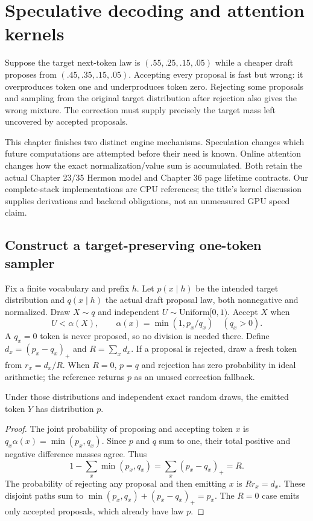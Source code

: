 \chapter{Speculative decoding and attention kernels}
\label{evod38:chapter}

Suppose the target next-token law is $(.55,.25,.15,.05)$ while a cheaper
draft proposes from $(.45,.35,.15,.05)$. Accepting every proposal is fast
but wrong: it overproduces token one and underproduces token zero. Rejecting
some proposals and sampling from the original target distribution after
rejection also gives the wrong mixture. The correction must supply precisely
the target mass left uncovered by accepted proposals.

This chapter finishes two distinct engine mechanisms. Speculation changes
which future computations are attempted before their need is known. Online
attention changes how the exact normalization/value sum is accumulated.
Both retain the actual Chapter 23/35 Hermon model and Chapter 36 page
lifetime contracts. Our complete-stack implementations are CPU references;
the title's kernel discussion supplies derivations and backend obligations,
not an unmeasured GPU speed claim.

\section{Construct a target-preserving one-token sampler}
\label{evod38:sampling}
Fix a finite vocabulary and prefix $h$. Let $p(x\mid h)$ be the intended
target distribution and $q(x\mid h)$ the actual draft proposal law, both
nonnegative and normalized. Draw $X\sim q$ and independent $U\sim
\mathrm{Uniform}[0,1)$. Accept $X$ when
\[
 U<\alpha(X),\qquad \alpha(x)=\min(1,p_x/q_x)\quad(q_x>0).
\]
A $q_x=0$ token is never proposed, so no division is needed there.
Define $d_x=(p_x-q_x)_+$ and $R=\sum_x d_x$. If a proposal is rejected,
draw a fresh token from $r_x=d_x/R$. When $R=0$, $p=q$ and rejection has
zero probability in ideal arithmetic; the reference returns $p$ as an
unused correction fallback.

\begin{proposition}
Under those distributions and independent exact random draws, the emitted
token $Y$ has distribution $p$.
\end{proposition}
\begin{proof}
The joint probability of proposing and accepting token $x$ is
$q_x\alpha(x)=\min(p_x,q_x)$. Since $p$ and $q$ sum to one, their total
positive and negative difference masses agree. Thus
\[
 1-\sum_x\min(p_x,q_x)=\sum_x(p_x-q_x)_+=R.
\]
The probability of rejecting any proposal and then emitting $x$ is
$Rr_x=d_x$. These disjoint paths sum to
$\min(p_x,q_x)+(p_x-q_x)_+=p_x$.
The $R=0$ case emits only accepted proposals, which already have law $p$.
\end{proof}

